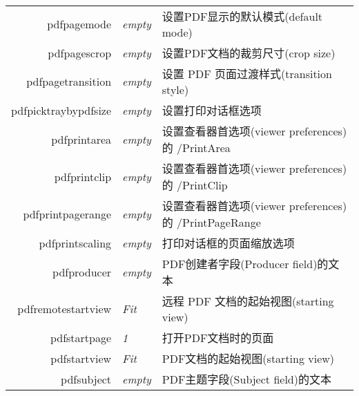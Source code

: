 \documentclass{article}
\begin{document}
\begin{longtable}{@{}>{\ttfamily}rlp{7cm}@{}}
  pdfpagemode                         & \textit{empty}         & 设置PDF显示的默认模式(default mode)                                                                      \\
  pdfpagescrop                        & \textit{empty}         & 设置PDF文档的裁剪尺寸(crop size)                                                                         \\
  pdfpagetransition                   & \textit{empty}         & 设置 PDF 页面过渡样式(transition style)                                                                 \\
  pdfpicktraybypdfsize
                                      & \textit{empty}         & 设置打印对话框选项                                                                                       \\
  pdfprintarea                        & \textit{empty}         & 设置查看器首选项(viewer preferences)的 /PrintArea                                                        \\
  pdfprintclip                        & \textit{empty}         & 设置查看器首选项(viewer preferences)的 /PrintClip                                                        \\
  pdfprintpagerange                   & \textit{empty}         & 设置查看器首选项(viewer preferences)的 /PrintPageRange                                                   \\
  pdfprintscaling                     & \textit{empty}         & 打印对话框的页面缩放选项                                                                                    \\
  pdfproducer                         & \textit{empty}         & PDF创建者字段(Producer field)的文本                                                                     \\
  pdfremotestartview                  & \textit{Fit}           & 远程 PDF 文档的起始视图(starting view)                                                                   \\
  pdfstartpage                        & \textit{1}             & 打开PDF文档时的页面                                                                                     \\
  pdfstartview                        & \textit{Fit}           & PDF文档的起始视图(starting view)                                                                       \\
  pdfsubject                          & \textit{empty}         & PDF主题字段(Subject field)的文本                                                                       \\

\end{longtable}
\end{document}
